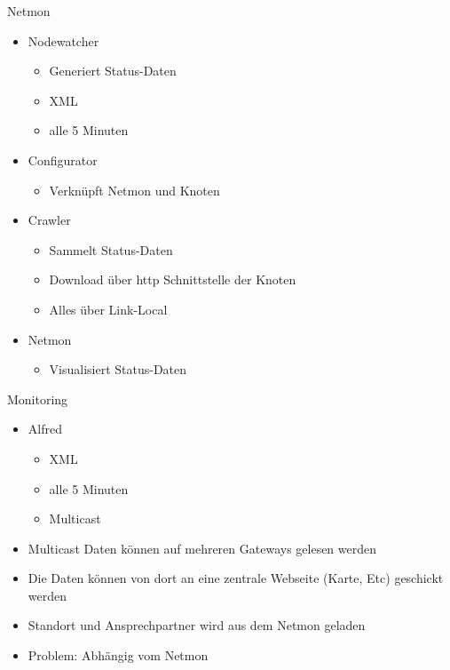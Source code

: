 \begin{frame}{Netmon}
    \begin{itemize}
        \item Nodewatcher
        \begin{itemize}
            \item Generiert Status-Daten
            \item XML
            \item alle 5 Minuten
        \end{itemize}
        \item Configurator
        \begin{itemize}
            \item Verknüpft Netmon und Knoten
        \end{itemize}
        \item Crawler
        \begin{itemize}
            \item Sammelt Status-Daten
            \item Download über http Schnittstelle der Knoten
            \item Alles über Link-Local
        \end{itemize}
        \item Netmon
        \begin{itemize}
            \item Visualisiert Status-Daten
        \end{itemize}
    \end{itemize}
\end{frame}

\begin{frame}{Monitoring}
    \begin{itemize}
        \item Alfred
        \begin{itemize}
            \item XML
            \item alle 5 Minuten
            \item Multicast
        \end{itemize}
        \item Multicast Daten können auf mehreren Gateways gelesen werden
        \item Die Daten können von dort an eine zentrale Webseite (Karte, Etc) geschickt werden
        \item Standort und Ansprechpartner wird aus dem Netmon geladen
        \item Problem: Abhängig vom Netmon
    \end{itemize}
\end{frame}

